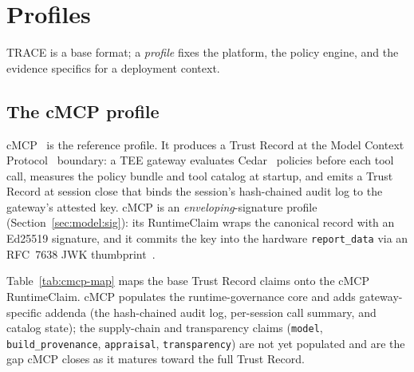\section{Profiles}
\label{sec:profiles}

TRACE is a base format; a \emph{profile} fixes the platform, the policy engine, and
the evidence specifics for a deployment context.

\subsection{The cMCP profile}

cMCP~\citep{cmcp2026} is the reference profile. It produces a Trust Record at the
Model Context Protocol~\citep{mcp2024} boundary: a TEE gateway evaluates
Cedar~\citep{cedar2023} policies before each tool call, measures the policy bundle
and tool catalog at startup, and emits a Trust Record at session close that binds
the session's hash-chained audit log to the gateway's attested key. cMCP is an
\emph{enveloping}-signature profile (Section~\ref{sec:model:sig}): its RuntimeClaim
wraps the canonical record with an Ed25519 signature, and it commits the key into
the hardware \texttt{report\_data} via an RFC~7638 JWK thumbprint~\citep{jose7638}.

Table~\ref{tab:cmcp-map} maps the base Trust Record claims onto the cMCP
RuntimeClaim. cMCP populates the runtime-governance core and adds gateway-specific
addenda (the hash-chained audit log, per-session call summary, and catalog state);
the supply-chain and transparency claims (\texttt{model},
\texttt{build\_provenance}, \texttt{appraisal}, \texttt{transparency}) are not yet
populated and are the gap cMCP closes as it matures toward the full Trust Record.

